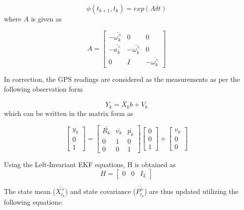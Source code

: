 \begin{equation}
    \phi(t_{k+1},t_{k}) = exp(A \delta t)
\end{equation}
where $A$ is given as 

\begin{equation}
    A = 
    \begin{bmatrix}
    -\bar{\omega_{k}^{\wedge}} & 0 & 0  \\
    -\bar{a_{k}^{\wedge}} & -\bar{\omega_{k}^{\wedge}} & 0 \\
    0 & I & -\bar{\omega_{k}^{\wedge}}
    \end{bmatrix}
\end{equation}

In correction, the GPS readings are considered as the measurements as per the following observation form 

\begin{equation}
    Y_{k}=\bar{X_{k}}b+V_{k}
\end{equation}
which can be written in the matrix form as 

\begin{equation}
    \begin{bmatrix}
    y_{k} \\
    0 \\
    1
    \end{bmatrix}
    =
    \begin{bmatrix}
    \bar{R_{k}} & \bar{v_{k}} & \bar{p_{k}} \\
    0 & 1 & 0 \\
    0 & 0 & 1
    \end{bmatrix}
    \begin{bmatrix}
    0\\
    0\\
    1
    \end{bmatrix}
    +
    \begin{bmatrix}
    v_{k}\\
    0\\
    0
    \end{bmatrix}
\end{equation}

Using the Left-Invariant EKF equations, H is obtained as 
\begin{equation}
H = 
    \begin{bmatrix}
    0 & 0 & I_{3}
    \end{bmatrix}
\end{equation}

The state mean ($\bar{X_{t_{k}}^+}$) and state covariance ($\bar{P_{t_{k}}^+}$) are thus updated utilizing the following equations: 

